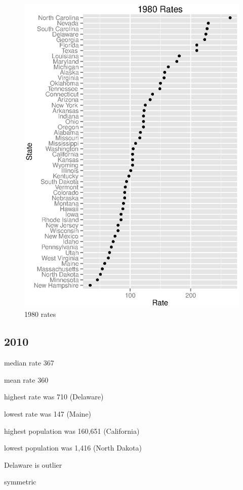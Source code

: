\documentclass{exam}
\begin{document}
  \begin{figure}[H]
    \centering
    \includegraphics[scale = 0.9]{figures/state_rates_1980.eps}
    \caption{1980 rates}
  \end{figure}

  \subsection{2010}
  \begin{itemize*}
    \item median rate 367
    \item mean rate 360
    \item highest rate was 710 (Delaware)
    \item lowest rate was 147 (Maine)
    \item highest population was 160,651 (California)
    \item lowest population was 1,416 (North Dakota)
    \item Delaware is outlier
    \item symmetric
  \end{itemize*}
\end{document}
